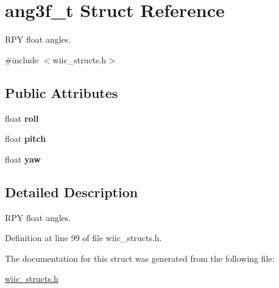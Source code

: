 \hypertarget{structang3f__t}{\section{ang3f\-\_\-t \-Struct \-Reference}
\label{structang3f__t}
}


\-R\-P\-Y float angles.  




{\ttfamily \#include $<$wiic\-\_\-structs.\-h$>$}

\subsection*{\-Public \-Attributes}
\begin{DoxyCompactItemize}
\item 
\hypertarget{structang3f__t_ae20d5612a396169a552d5cf1331ff44e}{float {\bfseries roll}}\label{structang3f__t_ae20d5612a396169a552d5cf1331ff44e}

\item 
\hypertarget{structang3f__t_a6b502912c6e6310980794a6659d1bb60}{float {\bfseries pitch}}\label{structang3f__t_a6b502912c6e6310980794a6659d1bb60}

\item 
\hypertarget{structang3f__t_a4aaa40b1ad6ca3477e92a40eab30f18f}{float {\bfseries yaw}}\label{structang3f__t_a4aaa40b1ad6ca3477e92a40eab30f18f}

\end{DoxyCompactItemize}


\subsection{\-Detailed \-Description}
\-R\-P\-Y float angles. 

\-Definition at line 99 of file wiic\-\_\-structs.\-h.



\-The documentation for this struct was generated from the following file\-:\begin{DoxyCompactItemize}
\item 
\hyperlink{wiic__structs_8h}{wiic\-\_\-structs.\-h}\end{DoxyCompactItemize}
